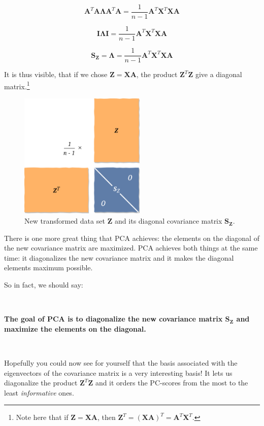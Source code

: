\documentclass[10pt,twocolumn]{article}
\begin{document}
\begin{equation}
\bm{A}^T \bm{A} \bm{\Lambda} \bm{A}^T \bm{A} =  \frac{1}{n-1} \bm{A}^T  \bm{X}^T \bm{X} \bm{A}
\end{equation}

\begin{equation}
\bm{I} \bm{\Lambda} \bm{I} =  \frac{1}{n-1} \bm{A}^T  \bm{X}^T \bm{X} \bm{A}
\end{equation}

\begin{equation}
\bm{S_Z}  = \bm{\Lambda} = \frac{1}{n-1} \bm{A}^T  \bm{X}^T \bm{X} \bm{A}
\end{equation}

It is thus visible, that if we chose $\bm{Z} = \bm{X} \bm{A}$, the product $\bm{Z}^T \bm{Z}$ give a diagonal matrix.\footnote{Note here that if $\bm{Z} = \bm{X} \bm{A}$, then $\bm{Z}^T = (\bm{X} \bm{A})^T = \bm{A}^T \bm{X}^T$.}

\begin{figure}[H]
\centering\includegraphics[width=6cm]{PC-scores.png}
\caption{New transformed data set $\bm{Z}$ and its diagonal covariance matrix $\bm{S_Z}$.}
\label{fig:PC-scores}
\end{figure}

There is one more great thing that PCA achieves: the elements on the diagonal of the new covariance matrix are maximized. PCA achieves both things at the same time: it diagonalizes the new covariance matrix and it makes the diagonal elements maximum possible.

So in fact, we should say:

\,\,

\textbf{The goal of PCA is to diagonalize the new covariance matrix $\bm{S_Z}$ and maximize the elements on the diagonal.}

\,\,

Hopefully you could now see for yourself that the basis associated with the eigenvectors of the covariance matrix is a very interesting basis! It lets us diagonalize the product $\bm{Z}^T \bm{Z}$ and it orders the PC-scores from the most to the least \textit{informative} ones.
\end{document}
